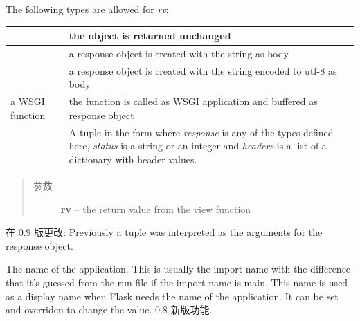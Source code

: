 \documentclass[a4paper,12pt]{sphinxmanual}
\begin{document}
\begin{fulllineitems}
\begin{fulllineitems}
The following types are allowed for \emph{rv}:

\begin{tabulary}{\linewidth}{|p{3.5cm}|p{9.5cm}|}
\hline

{\hyperref[api:flask.Flask.response_class]{}}
 & 
the object is returned unchanged
\\\hline

\href{http://docs.python.org/dev/library/stdtypes.html\#str}{}
 & 
a response object is created with the
string as body
\\\hline

 & 
a response object is created with the
string encoded to utf-8 as body
\\\hline

a WSGI function
 & 
the function is called as WSGI application
and buffered as response object
\\\hline

\href{http://docs.python.org/dev/library/stdtypes.html\#tuple}{}
 & 
A tuple in the form  where \emph{response} is any of the
types defined here, \emph{status} is a string
or an integer and \emph{headers} is a list of
a dictionary with header values.
\\\hline
\end{tabulary}

\begin{quote}\begin{description}
\item[{参数}] \leavevmode
\textbf{rv} -- the return value from the view function

\end{description}\end{quote}
在 0.9 版更改: Previously a tuple was interpreted as the arguments for the
response object.
\end{fulllineitems}


\begin{fulllineitems}
\label{api:flask.Flask.name}
The name of the application.  This is usually the import name
with the difference that it's guessed from the run file if the
import name is main.  This name is used as a display name when
Flask needs the name of the application.  It can be set and overriden
to change the value.
0.8 新版功能.
\end{fulllineitems}


\end{fulllineitems}
\end{document}
